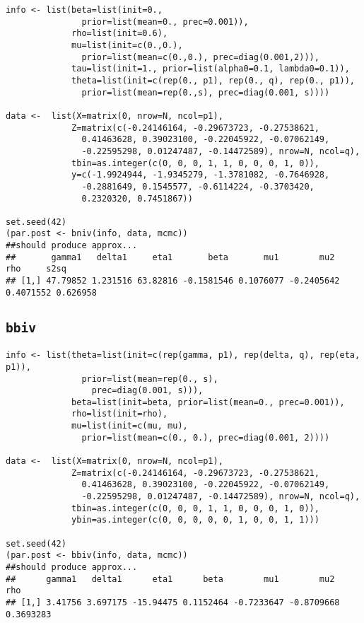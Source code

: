 \documentclass[12pt,oneside]{article}
\begin{document}
\begin{verbatim}
info <- list(beta=list(init=0.,
               prior=list(mean=0., prec=0.001)),
             rho=list(init=0.6),
             mu=list(init=c(0.,0.),
               prior=list(mean=c(0.,0.), prec=diag(0.001,2))),
             tau=list(init=1., prior=list(alpha0=0.1, lambda0=0.1)),
             theta=list(init=c(rep(0., p1), rep(0., q), rep(0., p1)),
               prior=list(mean=rep(0.,s), prec=diag(0.001, s))))

data <-  list(X=matrix(0, nrow=N, ncol=p1),
             Z=matrix(c(-0.24146164, -0.29673723, -0.27538621,
               0.41463628, 0.39023100, -0.22045922, -0.07062149,
               -0.22595298, 0.01247487, -0.14472589), nrow=N, ncol=q),
             tbin=as.integer(c(0, 0, 0, 1, 1, 0, 0, 0, 1, 0)),
             y=c(-1.9924944, -1.9345279, -1.3781082, -0.7646928,
               -0.2881649, 0.1545577, -0.6114224, -0.3703420,
               0.2320320, 0.7451867))

set.seed(42)
(par.post <- bniv(info, data, mcmc))
##should produce approx...
##       gamma1   delta1     eta1       beta       mu1        mu2       rho     s2sq
## [1,] 47.79852 1.231516 63.82816 -0.1581546 0.1076077 -0.2405642 0.4071552 0.626958
\end{verbatim}
\pagebreak

\subsection{\texttt{bbiv}}

\begin{verbatim}
info <- list(theta=list(init=c(rep(gamma, p1), rep(delta, q), rep(eta, p1)),
               prior=list(mean=rep(0., s),
                 prec=diag(0.001, s))),
             beta=list(init=beta, prior=list(mean=0., prec=0.001)),
             rho=list(init=rho),
             mu=list(init=c(mu, mu),
               prior=list(mean=c(0., 0.), prec=diag(0.001, 2))))

data <-  list(X=matrix(0, nrow=N, ncol=p1),
             Z=matrix(c(-0.24146164, -0.29673723, -0.27538621,
               0.41463628, 0.39023100, -0.22045922, -0.07062149,
               -0.22595298, 0.01247487, -0.14472589), nrow=N, ncol=q),
             tbin=as.integer(c(0, 0, 0, 1, 1, 0, 0, 0, 1, 0)),
             ybin=as.integer(c(0, 0, 0, 0, 0, 1, 0, 0, 1, 1)))

set.seed(42)
(par.post <- bbiv(info, data, mcmc))
##should produce approx...
##      gamma1   delta1      eta1      beta        mu1        mu2       rho
## [1,] 3.41756 3.697175 -15.94475 0.1152464 -0.7233647 -0.8709668 0.3693283
\end{verbatim}
\end{document}
